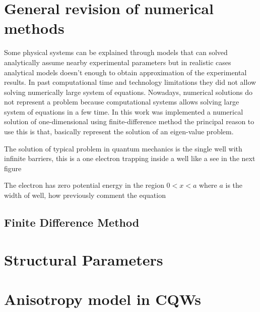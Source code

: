 \section{General revision of numerical methods}
Some physical systems can be explained through models that can solved analytically assume nearby experimental parameters but in realistic cases analytical models doesn't enough to obtain approximation of the experimental results. In past computational time and technology limitations they did not allow solving numerically large system of equations.  Nowadays, numerical solutions do not represent a problem because computational systems  allows solving large system of equations in  
a few time. In this work was implemented  a numerical solution of one-dimensional \sch using finite-difference method the principal reason to use this is that, basically represent the solution of an eigen-value problem. 

The solution of typical problem in quantum mechanics is the single  well with infinite  barriers, this is a one  electron trapping inside a well like a see in the  next figure 






The electron has zero potential energy in the region $0<x<a$ where $a$ is the width of well, how previously comment the \sch equation 



\subsection{Finite Difference Method}






\section{Structural Parameters}






\section{Anisotropy model in CQWs \label{sub:chap2-anisotropy-model}}

